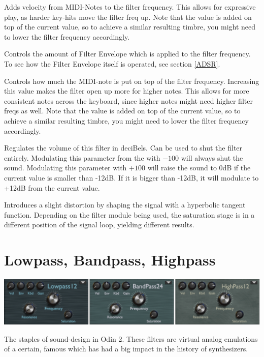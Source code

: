 {Adds velocity from MIDI-Notes to the filter frequency. This allows for expressive play, as harder key-hits move the filter freq up. Note that the value is added on top of the current value, so to achieve a similar resulting timbre, you might need to lower the filter frequency accordingly.}

{Controls the amount of Filter Envelope which is applied to the filter frequency. To see how the Filter Envelope itself is operated, see section \ref{ADSR}.}

{Controls how much the MIDI-note is put on top of the filter frequency. Increasing this value makes the filter open up more for higher notes. This allows for more consistent notes across the keyboard, since higher notes might need higher filter freqs as well. Note that the value is added on top of the current value, so to achieve a similar resulting timbre, you might need to lower the filter frequency accordingly.}

{Regulates the volume of this filter in deciBels. Can be used to shut the filter entirely. Modulating this parameter from the \modmatrix  with $-100$ will always shut the sound. Modulating this parameter with $+100$ will raise the sound to 0dB if the current value is smaller than -12dB. If it is bigger than -12dB, it will modulate to +12dB from the current value.}

{Introduces a slight distortion by shaping the signal with a hyperbolic tangent function. Depending on the filter module being used, the saturation stage is in a different position of the signal loop, yielding different results.}

\section{Lowpass, Bandpass, Highpass}
\begin{center}
    \includegraphics[width=\textwidth]{graphics/lp_bp_hp.png}
\end{center}

The staples of sound-design in Odin 2. These filters are virtual analog emulations of a certain, famous  which has had a big impact in the history of synthesizers.

